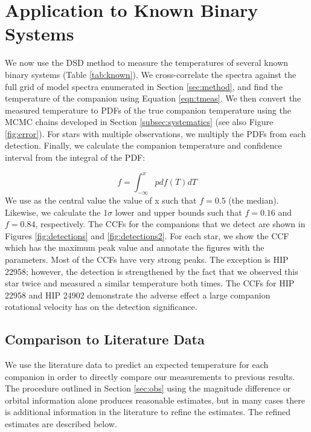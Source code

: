 \documentclass{emulateapj}
\begin{document}
\section{Application to Known Binary Systems}
\label{sec:results}

We now use the DSD method to measure the temperatures of several known binary systems (Table \ref{tab:known}). We cross-correlate the spectra against the full grid of model spectra enumerated in Section \ref{sec:method}, and find the temperature of the companion using Equation \ref{eqn:tmeas}. We then convert the measured temperature to PDFs of the true companion temperature using the MCMC chains developed in Section \ref{subsec:systematics} (see also Figure \ref{fig:error}). For stars with multiple observations, we multiply the PDFs from each detection. Finally, we calculate the companion temperature and confidence interval from the integral of the PDF:

\begin{equation}
f = \int_{-\infty}^x {pdf(T)dT}
\end{equation}
We use as the central value the value of x such that $f=0.5$ (the median). Likewise, we calculate the $1 \sigma$ lower and upper bounds such that $f = 0.16$ and $f = 0.84$, respectively. The CCFs for the companions that we detect are shown in Figures \ref{fig:detections} and \ref{fig:detections2}. For each star, we show the CCF which has the maximum peak value and annotate the figures with the parameters. Most of the CCFs have very strong peaks. The exception is HIP 22958; however, the detection is strengthened by the fact that we observed this star twice and measured a similar temperature both times. The CCFs for HIP 22958 and HIP 24902 demonstrate the adverse effect a large companion rotational velocity has on the detection significance.

\subsection{Comparison to Literature Data}
\label{subsec:expected_teffs}
We use the literature data to predict an expected temperature for each companion in order to directly compare our measurements to previous results. The procedure outlined in Section \ref{sec:obs} using the magnitude difference or orbital information alone produces reasonable estimates, but in many cases there is additional information in the literature to refine the estimates. The refined estimates are described below.
\end{document}
